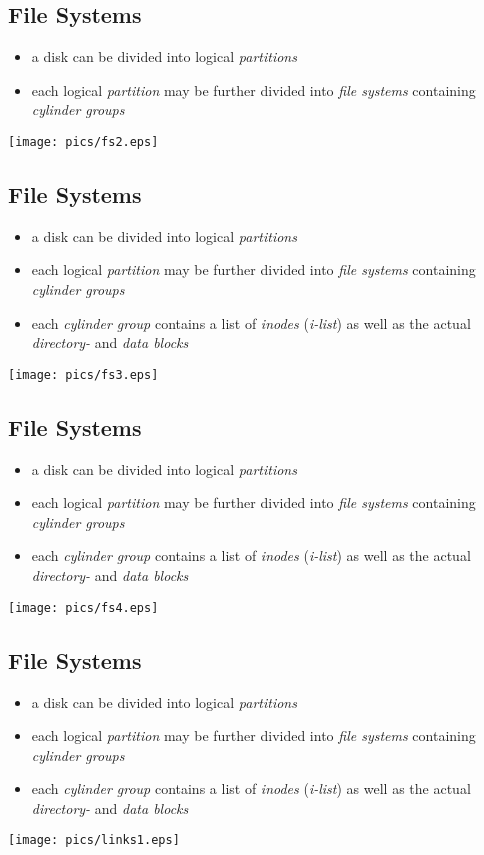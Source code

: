 \documentclass[xga]{xdvislides}
\begin{document}
\subsection{File Systems}
\begin{itemize}
	\item a disk can be divided into logical {\em partitions}
	\item each logical {\em partition} may be further divided into
		{\em file systems} containing {\em cylinder groups}
\end{itemize}
\texttt{[image: pics/fs2.eps]}

\subsection{File Systems}
\begin{itemize}
	\item a disk can be divided into logical {\em partitions}
	\item each logical {\em partition} may be further divided into
		{\em file systems} containing {\em cylinder groups}
	\item each {\em cylinder group} contains a list of {\em inodes} ({\em i-list})
		as well as the actual {\em directory-} and {\em data blocks}
\end{itemize}
\texttt{[image: pics/fs3.eps]}

\subsection{File Systems}
\begin{itemize}
	\item a disk can be divided into logical {\em partitions}
	\item each logical {\em partition} may be further divided into
		{\em file systems} containing {\em cylinder groups}
	\item each {\em cylinder group} contains a list of {\em inodes} ({\em i-list})
		as well as the actual {\em directory-} and {\em data blocks}
\end{itemize}
\texttt{[image: pics/fs4.eps]}

\subsection{File Systems}
\begin{itemize}
	\item a disk can be divided into logical {\em partitions}
	\item each logical {\em partition} may be further divided into
		{\em file systems} containing {\em cylinder groups}
	\item each {\em cylinder group} contains a list of {\em inodes} ({\em i-list})
		as well as the actual {\em directory-} and {\em data blocks}
\end{itemize}
\texttt{[image: pics/links1.eps]}
\end{document}
